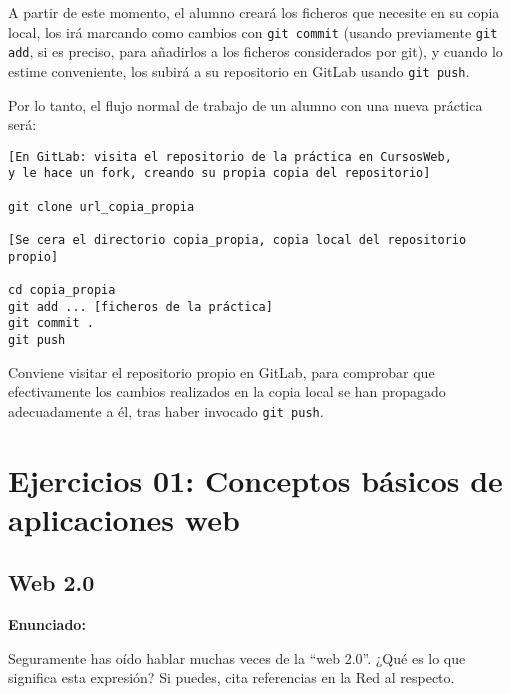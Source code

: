 A partir de este momento, el alumno creará los ficheros que necesite en su copia local, los irá marcando como cambios con \verb|git commit| (usando previamente \verb|git add|, si es preciso, para añadirlos a los ficheros considerados por git), y cuando lo estime conveniente, los subirá a su repositorio en GitLab usando \verb|git push|.

Por lo tanto, el flujo normal de trabajo de un alumno con una nueva práctica será:

\begin{verbatim}
[En GitLab: visita el repositorio de la práctica en CursosWeb,
y le hace un fork, creando su propia copia del repositorio]

git clone url_copia_propia

[Se cera el directorio copia_propia, copia local del repositorio propio]

cd copia_propia
git add ... [ficheros de la práctica]
git commit .
git push
\end{verbatim}

Conviene visitar el repositorio propio en GitLab, para comprobar que efectivamente los cambios realizados en la copia local se han propagado adecuadamente a él, tras haber invocado \verb|git push|.

\section{Ejercicios 01: Conceptos básicos de aplicaciones web}

\subsection{Web 2.0}
\label{subsec:web-20}

\textbf{Enunciado:}

Seguramente has oído hablar muchas veces de la ``web 2.0''. ¿Qué es lo que significa esta expresión? Si puedes, cita referencias en la Red al respecto.

